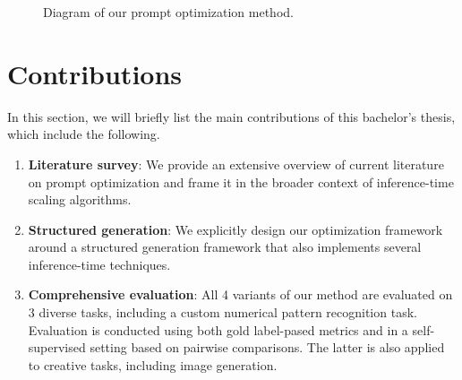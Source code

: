 \begin{figure}[ht]
    \caption{Diagram of our prompt optimization method.}
    \label{fig:methoddiagram}
\end{figure}


\section{Contributions}
In this section, we will briefly list the main contributions of this bachelor's thesis, which include the following. 
\begin{enumerate}
    \item \textbf{Literature survey}: We provide an extensive overview of current literature on prompt optimization and frame it in the broader context of inference-time scaling algorithms.
    \item \textbf{Structured generation}: We explicitly design our optimization framework around a structured generation framework that also implements several inference-time techniques.
    \item \textbf{Comprehensive evaluation}: All 4 variants of our method are evaluated on 3 diverse tasks, including a custom numerical pattern recognition task. Evaluation is conducted using both gold label-pased metrics and in a self-supervised setting based on pairwise comparisons. The latter is also applied to creative tasks, including image generation.
\end{enumerate}
